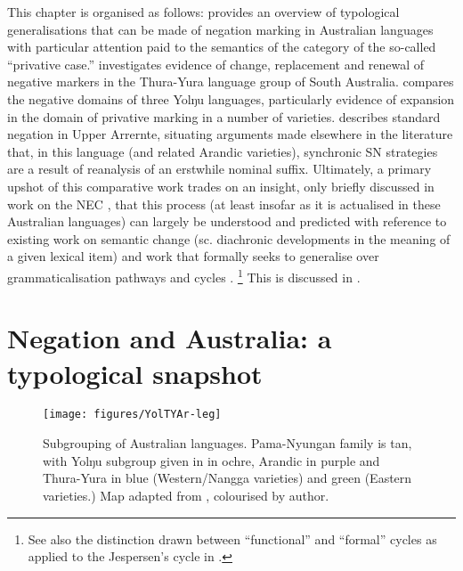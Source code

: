 \documentclass[output=paper,draft,draftmode,colorlinks,citecolor=brown]{langscibook}
\begin{document}
This chapter is organised as follows:  provides an
overview of typological generalisations that can be made of negation
marking in Australian languages with particular attention paid to the
semantics of the category of the so-called ``privative case.''
 investigates evidence of change, replacement and
renewal of negative markers in the Thura-Yura language group of South
Australia.  compares the negative domains of three
Yolŋu languages, particularly evidence of expansion in the domain of
privative marking in a number of varieties. 
describes standard negation in Upper Arrernte, situating arguments made
elsewhere in the literature \citep[particularly][]{Henderson2013} that,
in this language (and related Arandic varieties), synchronic SN
strategies are a result of reanalysis of an erstwhile nominal suffix.
Ultimately, a primary upshot of this comparative work trades on an
insight, only briefly discussed in work on the NEC
\parencite[e.g.][17]{Croft1991}, that this process (at least insofar as
it is actualised in these Australian languages) can largely be
understood and predicted with reference to existing work on semantic
change (sc. diachronic developments in the meaning of a given
lexical item) and work that formally seeks to generalise over
grammaticalisation pathways and cycles 
\parencites(e.g.)(){Deo2015}{Deo2015a}{Deo2018}.%
%
\footnote{See also the distinction drawn between ``functional'' and ``formal'' cycles as applied to the Jespersen's cycle in \citet{AhernClark2017}.} This is discussed in .

\section{Negation and Australia: a typological snapshot}\label{sec:austr-2}
\begin{figure}%
	\texttt{[image: figures/YolTYAr-leg]}
	\caption{Subgrouping of Australian languages. Pama-Nyungan family is tan, with Yolŋu subgroup given in in ochre, Arandic in purple and Thura-Yura in blue (Western\slash Nangga varieties) and green (Eastern varieties.) Map adapted from \citet[xxviii]{Dixon2002a}, colourised by author.}
\end{figure}\noindent
\end{document}
